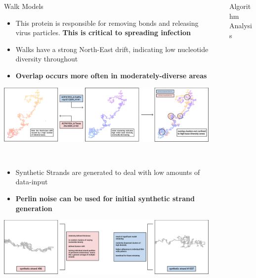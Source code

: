 \documentclass[final]{beamer}
\newlength{\sepwidth}
\newlength{\colwidth}
\newcommand{\separatorcolumn}{\begin{column}{\sepwidth}\end{column}}
\begin{document}
\begin{frame}[t]
\begin{columns}[t]
\begin{column}{\colwidth}
\begin{block}{Walk Models}
    \\
    \begin{itemize}
      \item This protein is responsible for removing bonds and releasing virus particles. \textbf{This is critical to spreading infection}
      \item Walks have a strong North-East drift, indicating low nucleotide diversity throughout
      \item \textbf{Overlap occurs more often in moderately-diverse areas}
    \end{itemize}
    \vspace{0.2 in}
    \includegraphics[width = \textwidth]{HA.pdf}
    
    \\
    \begin{itemize}
      \item Synthetic Strands are generated to deal with low amounts of data-input
      \item \textbf{Perlin noise can be used for initial synthetic strand generation}
    \end{itemize}
    \vspace{0.2 in}
    \includegraphics[width = \textwidth]{Synthetic.pdf}

  \end{block}
  
\end{column}

\separatorcolumn

\begin{column}{\colwidth}

  \begin{block}{Algorithm Analysis}


\end{block}
\end{column}
\end{columns}
\end{frame}
\end{document}
